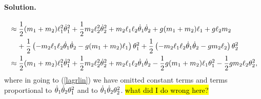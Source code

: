 \documentclass[11pt]{article}
\newcommand{\refeq}[1]{(\ref{#1})}
\newenvironment{solution}
{
    \paragraph{Solution.}
    \ignorespaces
}
{
    \bigskip
}
\begin{document}
\begin{solution}
\begin{align}
		&\approx \frac{1}{2} (m_1 + m_2) \ell_1^2 \dot{\theta}_1^2 + \frac{1}{2} m_2 \ell_2^2 \dot{\theta}_2^2 + m_2 \ell_1 \ell_2 \dot{\theta}_1 \dot{\theta}_2 + g (m_1 + m_2) \ell_1 + g \ell_2 m_2 \notag \\
		&\phantom{\approx\ } + \frac{1}{2} \left( -m_2 \ell_1 \ell_2 \dot{\theta}_1 \dot{\theta}_2 - g (m_1 + m_2) \ell_1 \right) \theta_1^2 + \frac{1}{2} \left( -m_2 \ell_1 \ell_2 \dot{\theta}_1 \dot{\theta}_2 - g m_2 \ell_2 \right) \theta_2^2 \\
		&\approx \frac{1}{2} (m_1 + m_2) \ell_1^2 \dot{\theta}_1^2 + \frac{1}{2} m_2 \ell_2^2 \dot{\theta}_2^2 + m_2 \ell_1 \ell_2 \dot{\theta}_1 \dot{\theta}_2 - \frac{1}{2} g (m_1 + m_2) \ell_1 \theta_1^2 - \frac{1}{2} g m_2 \ell_2 \theta_2^2, \label{lagrlin}
	\end{align}
	where in going to \refeq{lagrlin} we have omitted constant terms and terms proportional to $\dot{\theta}_1 \dot{\theta}_2 \theta_1^2$ and to $\dot{\theta}_1 \dot{\theta}_2 \theta_2^2$.  \hl{what did I do wrong here?}
	

\end{solution}
\end{document}
